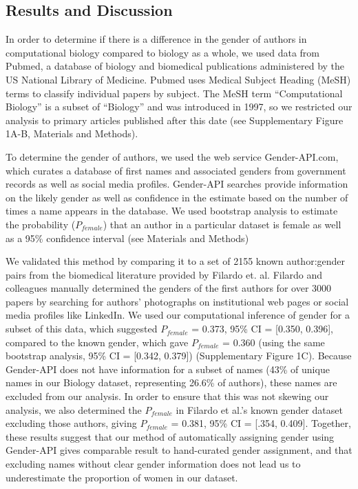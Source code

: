\documentclass[10pt,letterpaper]{article}
\begin{document}
\begin{flushleft}
\section*{Results and Discussion}
In order to determine if there is a difference in the gender of authors in computational biology compared to biology as a whole, we used data from Pubmed, a database of biology and biomedical publications administered by the US National Library of Medicine. Pubmed uses Medical Subject Heading (MeSH) terms to classify individual papers by subject. The MeSH term “Computational Biology” is a subset of “Biology” and was introduced in 1997, so we restricted our analysis to primary articles published after this date (see Supplementary Figure 1A-B, Materials and Methods).

To determine the gender of authors, we used the web service Gender-API.com, which curates a database of first names and associated genders from government records as well as social media profiles. Gender-API searches provide information on the likely gender as well as confidence in the estimate based on the number of times a name appears in the database. We used bootstrap analysis to estimate the probability ($P_{female}$) that an author in a particular dataset is female as well as a 95\% confidence interval (see Materials and Methods)

We validated this method by comparing it to a set of 2155 known author:gender pairs from the biomedical literature provided by Filardo et. al. \cite{Filardo2016} Filardo and colleagues manually determined the genders of the first authors for over 3000 papers by searching for authors’ photographs on institutional web pages or social media profiles like LinkedIn. We used our computational inference of gender for a subset of this data, which suggested $P_{female}$ = 0.373, 95\% CI = [0.350, 0.396], compared to the known gender, which gave $P_{female}$ = 0.360 (using the same bootstrap analysis, 95\% CI = [0.342, 0.379]) (Supplementary Figure 1C). Because Gender-API does not have information for a subset of names (43\% of unique names in our Biology dataset, representing 26.6\% of authors), these names are excluded from our analysis. In order to ensure that this was not skewing our analysis, we also determined the $P_{female}$ in Filardo et al.'s known gender dataset excluding those authors, giving $P_{female}$ = 0.381, 95\% CI = [.354, 0.409]. Together, these results suggest that our method of automatically assigning gender using Gender-API gives comparable result to hand-curated gender assignment, and that excluding names without clear gender information does not lead us to underestimate the proportion of women in our dataset.


\end{flushleft}
\end{document}
